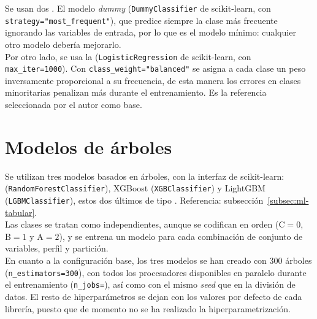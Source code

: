 Se usan dos . El modelo \textit{dummy} (\texttt{DummyClassifier} de scikit-learn, con \texttt{strategy=\allowbreak "most\_\allowbreak frequent"}), que predice siempre la clase más frecuente ignorando las variables de entrada, por lo que es el modelo mínimo: cualquier otro modelo debería mejorarlo.
\\

Por otro lado, se usa la  (\texttt{LogisticRegression} de scikit-learn, con \mbox{\texttt{max\_iter=1000}}). Con \texttt{class\_\allowbreak weight=\allowbreak "balanced"} se asigna a cada clase un peso inversamente proporcional a su frecuencia, de esta manera los errores en clases minoritarias penalizan más durante el entrenamiento. Es la referencia seleccionada por el autor como base.
\\


\section{Modelos de árboles}
\label{sec:dis-modelos-arboles}

Se utilizan tres modelos basados en árboles, con la interfaz de scikit-learn:  (\texttt{Random\allowbreak Forest\allowbreak Classifier}), XGBoost (\texttt{XGB\allowbreak Classifier}) y LightGBM (\texttt{LGBM\allowbreak Classifier}), estos dos últimos de tipo . Referencia: subsección~\ref{subsec:ml-tabular}.
\\

Las clases se tratan como independientes, aunque se codifican en orden ($\mathrm{C} = 0$, $\mathrm{B} = 1$ y $\mathrm{A} = 2$), y se entrena un modelo para cada combinación de conjunto de variables, perfil y partición.
\\

En cuanto a la configuración base, los tres modelos se han creado con 300 árboles (\mbox{\texttt{n\_estimators=300}}), con todos los procesadores disponibles en paralelo durante el entrenamiento (\texttt{n\_jobs=}), así como con el mismo \textit{seed} que en la división de datos. El resto de hiperparámetros se dejan con los valores por defecto de cada librería, puesto que de momento no se ha realizado la hiperparametrización.
\\

